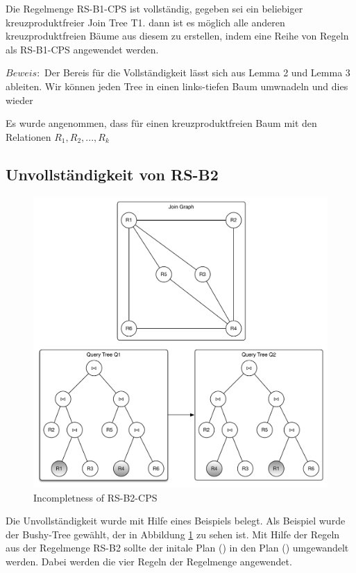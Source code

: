 \begin{teo}
Die Regelmenge RS-B1-CPS ist vollständig, gegeben sei ein beliebiger kreuzproduktfreier Join Tree T1. dann ist es möglich alle anderen kreuzproduktfreien Bäume aus diesem zu erstellen, indem eine Reihe von Regeln als RS-B1-CPS angewendet werden.
\end{teo}

$Beweis:$ Der Bereis für die Vollständigkeit lässt sich aus Lemma 2 und Lemma 3 ableiten. Wir können jeden Tree in einen links-tiefen Baum umwnadeln und dies wieder 




Es wurde angenommen, dass für einen kreuzproduktfreien Baum mit den Relationen $R_1, R_2, ..., R_k$


\subsection{Unvollständigkeit von RS-B2}

\begin{figure}[ht]
  \centering
  \includegraphics[width=\textwidth]{02_Related_Work/Graphs.pdf}
  \caption{Incompletness of RS-B2-CPS}
  \label{Incompleteness_RS-B2-CPS}
\end{figure}


Die Unvollständigkeit wurde mit Hilfe eines Beispiels belegt. Als Beispiel wurde der Bushy-Tree gewählt, der in Abbildung \ref{Incompleteness_RS-B2-CPS} zu sehen ist. Mit Hilfe der Regeln aus der Regelmenge RS-B2 sollte der initale Plan () in den Plan () umgewandelt werden. Dabei werden die vier Regeln der Regelmenge angewendet.


